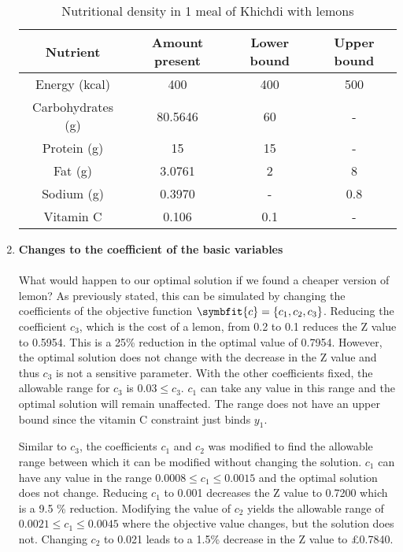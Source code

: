 \documentclass[
]{article}
\begin{document}
\begin{enumerate}
	      \begin{table}[h!]
	      	\centering
	      	\begin{tabular}{||c | c | c | c ||} 
	      		\hline
	      		Nutrient          & Amount present & Lower bound & Upper bound \\ [0.5ex] 
	      		\hline\hline
	      		Energy (kcal)     & 400            & 400         & 500         \\ 
	      		Carbohydrates (g) & 80.5646        & 60          & -           \\
	      		Protein (g)       & 15             & 15          & -           \\
	      		Fat (g)           & 3.0761         & 2           & 8           \\
	      		Sodium (g)        & 0.3970         & -           & 0.8         \\
	      		Vitamin C         & 0.106          & 0.1         & -           \\[1ex] 
	      		\hline
	      	\end{tabular}
	      	\caption{Nutritional density in 1 meal of Khichdi with lemons}
	      	\label{table:2}
	      \end{table}
	      	          
	\item \textbf{Changes to the coefficient of the basic variables} \\
	      \\
	      What would happen to our optimal solution if we found a cheaper version of lemon? As previously stated, this can be simulated by changing the coefficients of the objective function $\symbfit{c} = \{c_1, c_2, c_3 \}$.
	      Reducing the coefficient $c_3$, which is the cost of a lemon, from 0.2 to 0.1 reduces the Z value to 0.5954. This is a 25\% reduction in the optimal value of 0.7954.
	      However, the optimal solution does not change with the decrease in the Z value and thus $c_3$ is not a sensitive parameter.
	      With the other coefficients fixed, the allowable range for $c_3$ is \(0.03 \le c_3\). $c_1$ can take any value in this range and the optimal solution will remain unaffected. The range does not have an upper bound since the vitamin C constraint just binds $y_1$.
	      	        
	      Similar to $c_3$, the coefficients $c_1$ and $c_2$ was modified to find the allowable range between which it can be modified without changing the solution.
	      $c_1$ can have any value in the range \(0.0008 \le c_1 \le 0.0015\) and the optimal solution does not change. Reducing $c_1$ to 0.001 decreases the Z value to 0.7200 which is a 9.5 \% reduction.
	      Modifying the value of $c_2$ yields the allowable range of \(0.0021 \le c_1 \le 0.0045\) where the objective value changes, but the solution does not. Changing $c_2$ to 0.021 leads to a 1.5\% decrease in the Z value to \pounds 0.7840.
	      	      

\end{enumerate}
\end{document}
